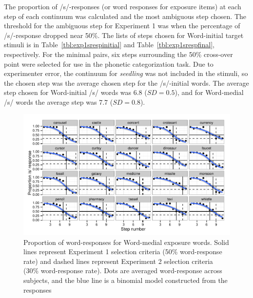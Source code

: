 The proportion of /s/-responses (or word responses for exposure items) at each step of each continuum was calculated and the most ambiguous step chosen. 
The threshold for the ambiguous step for Experiment 1 was when the percentage of /s/-response dropped near 50\%. 
The lists of steps chosen for Word-initial target stimuli is in Table~\ref{tbl:exp1srespinitial} and Table~\ref{tbl:exp1srespfinal}, respectively.
For the minimal pairs, six steps surrounding the 50\% cross-over point were selected for use in the phonetic categorization task.  
Due to experimenter error, the continuum for \emph{seedling} was not included in the stimuli, so the chosen step was the average chosen step for the /s/-initial words.  
The average step chosen for Word-initial /s/ words was 6.8 ($SD = 0.5$), and for Word-medial /s/ words the average step was 7.7 ($SD = 0.8$).

\begin{figure}
\includegraphics[width=\textwidth]{graphs/sfinalpretest.pdf}
\caption{Proportion of word-responses for Word-medial exposure words. Solid lines represent Experiment 1 selection criteria (50\% word-response rate) and dashed lines represent Experiment 2 selection criteria (30\% word-response rate).  Dots are averaged word-response across subjects, and the blue line is a binomial model constructed from the responses}
\end{figure}


